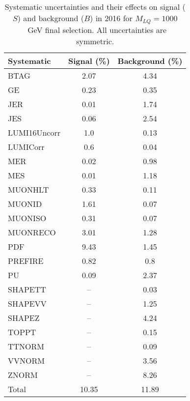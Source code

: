 \begin{table}[htbp]
\begin{center}
\caption{Systematic uncertainties and their effects on signal ($S$) and background ($B$) in 2016 for $M_{LQ}=1000$~GeV final selection. All uncertainties are symmetric.}
\begin{tabular}{lcc}
\hline\hline
Systematic & Signal (\%) & Background (\%) \\ \hline 
BTAG & 2.07 & 4.34\\ 
GE & 0.23 & 0.35\\ 
JER & 0.01 & 1.74\\ 
JES & 0.06 & 2.54\\ 
LUMI16Uncorr & 1.0 & 0.13\\ 
LUMICorr & 0.6 & 0.04\\ 
MER & 0.02 & 0.98\\ 
MES & 0.01 & 1.18\\ 
MUONHLT & 0.33 & 0.11\\ 
MUONID & 1.61 & 0.07\\ 
MUONISO & 0.31 & 0.07\\ 
MUONRECO & 3.01 & 1.28\\ 
PDF & 9.43 & 1.45\\ 
PREFIRE & 0.82 & 0.8\\ 
PU & 0.09 & 2.37\\ 
SHAPETT & -- & 0.03\\ 
SHAPEVV & -- & 1.25\\ 
SHAPEZ & -- & 4.24\\ 
TOPPT & -- & 0.15\\ 
TTNORM & -- & 0.09\\ 
VVNORM & -- & 3.56\\ 
ZNORM & -- & 8.26\\ 
Total & 10.35 & 11.89\\ \hline \hline
\end{tabular}
\label{tab:SysUncertainties_uujj_1000}
\end{center}
\end{table}

